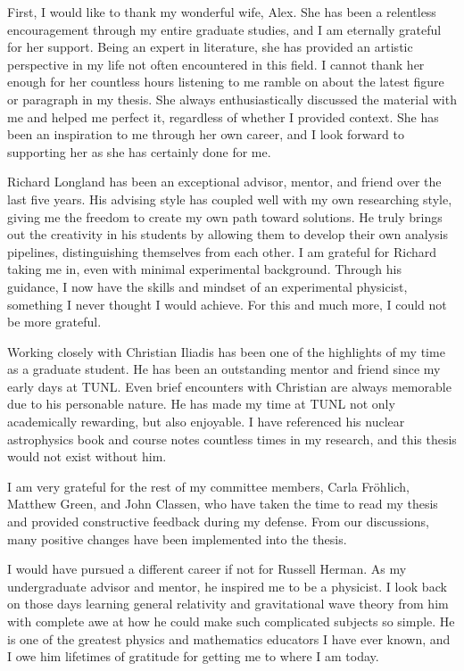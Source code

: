 \begin{acknowledgements}
First, I would like to thank my wonderful wife, Alex. She has been a relentless encouragement through my entire graduate studies, and I am eternally grateful for her support. Being an expert in literature, she has provided an artistic perspective in my life not often encountered in this field. I cannot thank her enough for her countless hours listening to me ramble on about the latest figure or paragraph in my thesis. She always enthusiastically discussed the material with me and helped me perfect it, regardless of whether I provided context. She has been an inspiration to me through her own career, and I look forward to supporting her as she has certainly done for me.

Richard Longland has been an exceptional advisor, mentor, and friend over the last five years. His advising style has coupled well with my own researching style, giving me the freedom to create my own path toward solutions. He truly brings out the creativity in his students by allowing them to develop their own analysis pipelines, distinguishing themselves from each other. I am grateful for Richard taking me in, even with minimal experimental background. Through his guidance, I now have the skills and mindset of an experimental physicist, something I never thought I would achieve. For this and much more, I could not be more grateful.

Working closely with Christian Iliadis has been one of the highlights of my time as a graduate student. He has been an outstanding mentor and friend since my early days at TUNL. Even brief encounters with Christian are always memorable due to his personable nature. He has made my time at TUNL not only academically rewarding, but also enjoyable. I have referenced his nuclear astrophysics book and course notes countless times in my research, and this thesis would not exist without him.

I am very grateful for the rest of my committee members, Carla Fr\"{o}hlich, Matthew Green, and John Classen, who have taken the time to read my thesis and provided constructive feedback during my defense. From our discussions, many positive changes have been implemented into the thesis.

I would have pursued a different career if not for Russell Herman. As my undergraduate advisor and mentor, he inspired me to be a physicist. I look back on those days learning general relativity and gravitational wave theory from him with complete awe at how he could make such complicated subjects so simple. He is one of the greatest physics and mathematics educators I have ever known, and I owe him lifetimes of gratitude for getting me to where I am today.


\end{acknowledgements}
